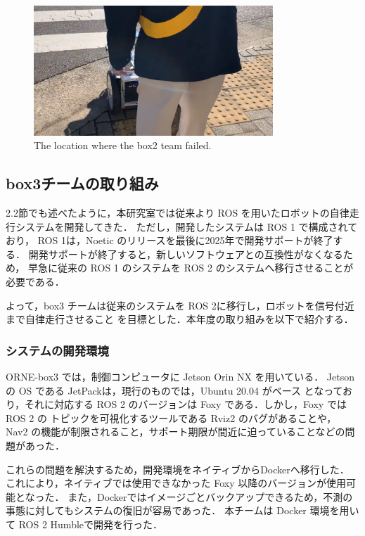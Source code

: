 \documentclass[twocolumn, 9pt]{jsproceedings}
\begin{document}
\begin{figure}[h!]
  \centering
  \includegraphics[width=90mm]{fig/result_box2_cut.pdf}
  \caption{The location where the box2 team failed.}
  \label{fig:box2-result}
\end{figure}

\subsection{box3チームの取り組み}
2.2節でも述べたように，本研究室では従来より ROS を用いたロボットの自律走行システムを開発してきた．
ただし，開発したシステムは ROS 1 で構成されており，
ROS 1は，Noetic\cite{noetic} のリリースを最後に2025年で開発サポートが終了する．
開発サポートが終了すると，新しいソフトウェアとの互換性がなくなるため，
早急に従来の ROS 1 のシステムを ROS 2 \cite{ros2}のシステムへ移行させることが必要である．

よって，box3 チームは従来のシステムを ROS 2に移行し，ロボットを信号付近まで自律走行させること
を目標とした．本年度の取り組みを以下で紹介する．

\subsubsection{システムの開発環境}
ORNE-box3 では，制御コンピュータに Jetson Orin NX を用いている．
Jetson の OS である JetPack\cite{JetPack}は，現行のものでは，Ubuntu 20.04\cite{ubuntu} がベース
となっており，それに対応する ROS 2 のバージョンは Foxy\cite{foxy} である．しかし，Foxy では ROS 2 の
トピックを可視化するツールである Rviz2\cite{rviz2} のバグ\cite{rviz-bag}があることや，
Nav2\cite{nav2} の機能が制限されること，サポート期限が間近に迫っていることなどの問題があった．

これらの問題を解決するため，開発環境をネイティブからDocker\cite{Docker}へ移行した．
これにより，ネイティブでは使用できなかった Foxy 以降のバージョンが使用可能となった．
また，Dockerではイメージごとバックアップできるため，不測の事態に対してもシステムの復旧が容易であった．
本チームは Docker 環境を用いて ROS 2 Humble\cite{humble}で開発を行った．
\end{document}
